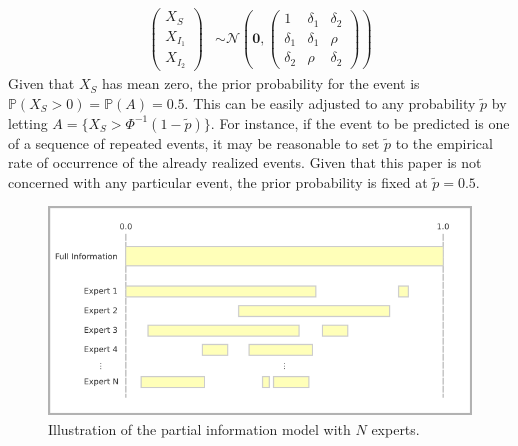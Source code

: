 \documentclass[11pt]{article}
\renewcommand{\P}{\mathbb{P}}
\theoremstyle{definition}
\theoremstyle{definition}
\begin{document}
\begin{align}
\left(\begin{matrix} X_S \\ X_{I_1}\\ X_{I_2} \end{matrix}\right) &\sim \mathcal{N}\left(
 \boldsymbol{0},  \left(\begin{matrix} 
1 & \delta_1 & \delta_2\\
\delta_1 & \delta_1 &\rho\\
\delta_2 & \rho & \delta_2
 \end{matrix}\right)\right) \label{twoExperts}
\end{align}
Given that $X_S$ has mean zero, the prior probability for the event is $\P(X_S > 0) = \P(A) = 0.5$. This can be easily adjusted to any probability $\tilde{p}$ by letting $A = \{ X_S > \Phi^{-1}(1-\tilde{p}) \}$. For instance, if the event to be predicted is one of a sequence of repeated events,  it may be reasonable to set $\tilde{p}$ to the empirical rate of occurrence of the already realized events. Given that this paper is not concerned with any particular event, the prior probability is  fixed at $\tilde{p} = 0.5$.  

\begin{figure}[htbp]
   \includegraphics[width = \textwidth]{N=N} %
   \caption{Illustration of the partial information model with $N$ experts.}
   \label{diagramN}
\end{figure}
\end{document}
